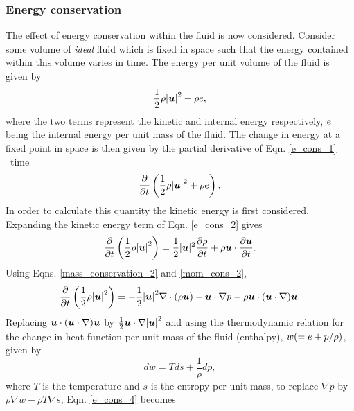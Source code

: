 \subsubsection{Energy conservation} 
The effect of energy conservation within the fluid is now considered. Consider some volume of \textit{ideal} fluid which is fixed in space such that the energy contained within this volume varies in time. The energy per unit volume of the fluid is given by
\begin{equation}\label{e_cons_1}
 \frac{1}{2}\rho{|{\mbox{\boldmath$u$}}|}^{2}+\rho e,
\end{equation}
where the two terms represent the kinetic and internal energy respectively, $e$ being the internal energy per unit mass of the fluid. The change in energy at a fixed point in space is then given by the partial derivative of Eqn. \ref{e_cons_1} \wrt\ time
\begin{equation}\label{e_cons_2}
 \frac{\partial}{\partial{t}}\left(\frac{1}{2}\rho{|{\mbox{\boldmath$u$}}|}^{2}+\rho e\right).
\end{equation}
In order to calculate this quantity the kinetic energy is first considered. Expanding the kinetic energy term of Eqn. \ref{e_cons_2} gives
\begin{equation}\label{e_cons_3}
 \frac{\partial}{\partial{t}}\left(\frac{1}{2}\rho{|{\mbox{\boldmath$u$}}|}^{2}\right)=\frac{1}{2}|{\mbox{\boldmath$u$}}|^{2}\frac{\partial\rho}{\partial{t}}+
                                                                 \rho{\mbox{\boldmath$u$}}\cdot\frac{\partial{\mbox{\boldmath$u$}}}{\partial{t}}.
\end{equation}
Using Eqns. \ref{mass_conservation_2} and \ref{mom_cons_2},
\begin{equation}\label{e_cons_4}
 \frac{\partial}{\partial{t}}\left(\frac{1}{2}\rho{|{\mbox{\boldmath$u$}}|}^{2}\right)=-\frac{1}{2}{|{\mbox{\boldmath$u$}}|}^{2}\nabla\cdot(\rho{\mbox{\boldmath$u$}})
                                                                  -{\mbox{\boldmath$u$}}\cdot\nabla{p}
                                                                  -\rho{\mbox{\boldmath$u$}}\cdot({\mbox{\boldmath$u$}}\cdot\nabla){\mbox{\boldmath$u$}}.
\end{equation}
Replacing ${\mbox{\boldmath$u$}}\cdot({\mbox{\boldmath$u$}}\cdot\nabla){\mbox{\boldmath$u$}}$ by ${\textstyle \frac{1}{2}}{\mbox{\boldmath$u$}}\cdot\nabla{|{\mbox{\boldmath$u$}}|}^{2}$ and using the thermodynamic relation for the change in heat function per unit mass of the fluid (enthalpy), $w(=e+p/\rho)$,  given by \citep{michelsen_2007}
\begin{equation}\label{e_cons_5}
 dw=Tds+\frac{1}{\rho}dp,
\end{equation}
where $T$ is the temperature and $s$ is the entropy per unit mass, to replace $\nabla{p}$ by $\rho\nabla{w}-\rho{T}\nabla{s}$, Eqn. \ref{e_cons_4} becomes

